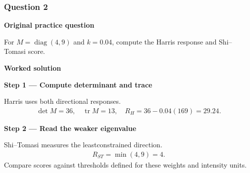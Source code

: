 \documentclass[letterpaper,11pt,english,openany,oneside]{jupyterBook}
\begin{document}
\par

\par\medskip


\subsubsection{Question 2}
\label{\detokenize{lectures/lecture05/tldr:question-2}}
\par\medskip\textbf{Original practice question}\par\smallskip

\sphinxAtStartPar
For \(M=\operatorname{diag}(4,9)\) and \(k=0.04\), compute the Harris response and Shi–Tomasi score.

\par\medskip

\par\medskip
\textbf{Worked solution}\par\smallskip

\par\medskip{}
{\color{QuizStepRed}\bfseries Step 1 — Compute determinant and trace}\par\smallskip

\sphinxAtStartPar
{} Harris uses both directional responses.
{\color{QuizMathBlue} \begin{equation*}
\begin{split}\det M=36,\quad\operatorname{tr}M=13,\quad R_H=36-0.04(169)=29.24.\end{split}
\end{equation*}}
\par

\par\medskip{}
{\color{QuizStepRed}\bfseries Step 2 — Read the weaker eigenvalue}\par\smallskip

\sphinxAtStartPar
{} Shi–Tomasi measures the least\sphinxhyphen{}constrained direction.
{\color{QuizMathBlue} \begin{equation*}
\begin{split}R_{ST}=\min(4,9)=4.\end{split}
\end{equation*}}
\sphinxAtStartPar
Compare scores against thresholds defined for these weights and intensity units.

\par

\par\medskip
\end{document}
